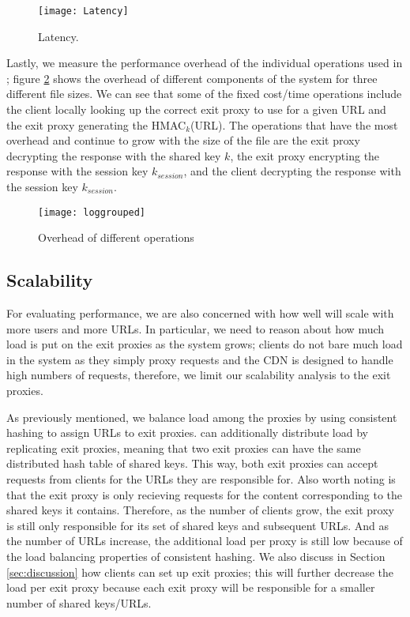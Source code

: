 \begin{figure}[t!]
\centering
\texttt{[image: Latency]}
\caption{Latency.}
\label{fig:latency}
\end{figure}

Lastly, we measure the performance overhead of the individual operations used in \system{}; figure \ref{fig:overhead2} shows 
the overhead of different components of the system for three different file sizes.  We can see that some of the fixed cost/time 
operations include the client locally looking up the correct exit proxy to use for a given URL and the exit proxy generating the 
HMAC$_{k}$(URL).  The operations that have the most overhead and continue to grow with the size of the file are the exit proxy decrypting 
the response with the shared key $k$, the exit proxy encrypting the response with the session key $k_{session}$, and the client 
decrypting the response with the session key $k_{session}$.

\begin{figure}[t!]
\centering
\texttt{[image: loggrouped]}
\caption{Overhead of different operations}
\label{fig:overhead2}
\end{figure}

\subsection{Scalability}
For evaluating performance, we are also concerned with how well \system{} will scale with more users 
and more URLs.  In particular, we need to reason about how much load is put on the exit proxies as the 
system grows; clients do not bare much load in the system as they simply proxy requests and the CDN is designed 
to handle high numbers of requests, therefore, we limit our scalability analysis to the exit proxies.  

As previously mentioned, we balance load among the proxies by using consistent hashing to assign URLs to 
exit proxies.  \system{} can additionally distribute load by replicating exit proxies, meaning that two exit proxies can 
have the same distributed hash table of shared keys.  This way, both exit proxies can accept requests from clients for 
the URLs they are responsible for.  Also worth noting is that the exit proxy is only recieving requests for the content 
corresponding to the shared keys it contains.  Therefore, as the number of clients grow, the exit proxy is still only responsible 
for its set of shared keys and subsequent URLs.  And as the number of URLs increase, the additional load per proxy is 
still low because of the load balancing properties of consistent hashing.  We also discuss in Section \ref{sec:discussion} how 
clients can set up exit proxies; this will further decrease the load per exit proxy because each exit proxy will be responsible 
for a smaller number of shared keys/URLs.

